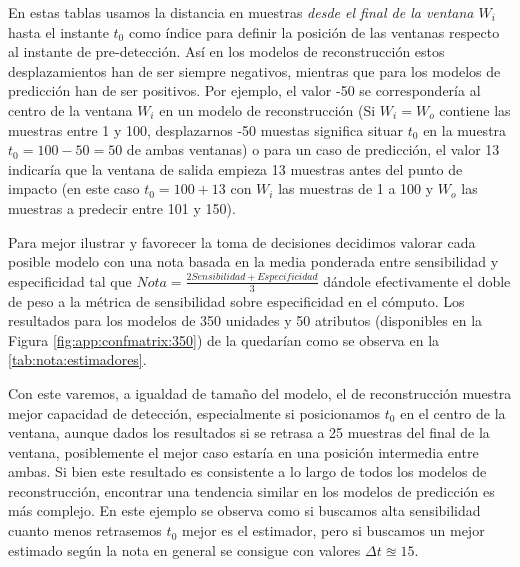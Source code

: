 En estas tablas usamos la distancia en muestras \textit{desde el final de la ventana $W_i$} hasta el instante $t_0$ como índice para definir la posición de las ventanas respecto al instante de pre-detección. Así en los modelos de reconstrucción estos desplazamientos han de ser siempre negativos, mientras que para los modelos de predicción han de ser positivos. Por ejemplo, el valor -50 se correspondería al centro de la ventana $W_i$ en un modelo de reconstrucción (Si $W_i=W_o$ contiene las muestras entre 1 y 100, desplazarnos -50 muestas significa situar $t_0$ en la muestra $t_0=100-50 = 50$ de ambas ventanas) o para un caso de predicción, el valor 13 indicaría que la ventana de salida empieza 13 muestras antes del punto de impacto (en este caso $t_0 = 100 + 13$ con $W_i$ las muestras de 1 a 100 y $W_o$ las muestras a predecir entre 101 y 150).

Para mejor ilustrar y favorecer la toma de decisiones decidimos valorar cada posible modelo con una nota basada en la media ponderada entre sensibilidad y especificidad tal que $Nota=\frac{2Sensibilidad+Especificidad}{3}$ dándole efectivamente el doble de peso a la métrica de sensibilidad sobre especificidad en el cómputo. Los resultados para los modelos de 350 unidades y 50 atributos (disponibles en la Figura \ref{fig:app:confmatrix:350}) de la  quedarían como se observa en la \autoref{tab:nota:estimadores}.


Con este varemos, a igualdad de tamaño del modelo, el de reconstrucción muestra mejor capacidad de detección, especialmente si posicionamos $t_0$ en el centro de la ventana, aunque dados los resultados si se retrasa a 25 muestras del final de la ventana, posiblemente el mejor caso estaría en una posición intermedia entre ambas. Si bien este resultado es consistente a lo largo de todos los modelos de reconstrucción, encontrar una tendencia similar en los modelos de predicción es más complejo. En este ejemplo se observa como si buscamos alta sensibilidad cuanto menos retrasemos $t_0$ mejor es el estimador, pero si buscamos un mejor estimado según la nota en general se consigue con valores $\Delta t \approxeq 15$. 

